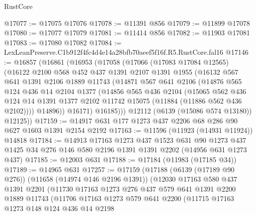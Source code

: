 \begin{lexlean}{RustCore}
\begin{coremodule}
@17077 := @17075 @17076
@17078 := @11391 @856
@17079 := @11899 @17078
@17080 := @17077 @17079
@17081 := @11414 @856
@17082 := @11903 @17081
@17083 := @17080 @17082
@17084 := LexLeanPreserve.C1b912f4fc4d4e14a28bfb70aeef5f16f.R5.RustCore.fal16
@17146 := @16857
    (@16861
      (@16953
        (@17058
          (@17066
            (@17083 @17084 @12565)
            (@16122
              @2100
              @568
              @452
              @437
              @1391
              @2107
              @1391
              @1955
              (@16132
                @567
                @641
                @1391
                @2106
                @1889
                @11743
                (@14871
                  @567
                  @641
                  @2106
                  (@14876
                    @565
                    @124
                    @436
                    @14
                    @2104
                    @1377
                    (@14856
                      @565
                      @436
                      @2104
                      (@15065
                        @562
                        @436
                        @124
                        @14
                        @1391
                        @1377
                        @2102
                        @11742
                        @15075
                        (@11884 (@11886 @562 @436 @2102))))
                    @14896))
                @16171)
              @16185)))
        @12112
        (@6139 (@15086 @574 @13180))
        @12125))
@17159 := @14917 @631 @177 @1273 @437 @2206 @68 @286 @90 @627 @1603 @1391 @2154 @2192
@17163 := @11596 (@11923 (@14931 @11924)) @14818
@17184 := @14913
    @17163
    @1273
    @437
    @1523
    @631
    @90
    @1273
    @437
    @1425
    @34
    @276
    @146
    @580
    @2196
    @1391
    @1391
    @2202
    (@14956 @631 @1273 @437)
@17185 := @12003 @631
@17188 := @17184 (@11983 (@17185 @34))
@17189 := @14965 @631
@17257 := @17159
    (@17188
      (@6139 (@17189 @90 @276))
      (@11658 (@14974 @146 @2196 @1391))
      (@12030
        @17163
        @580
        @437
        @1391
        @2201
        (@11730
          @17163
          @1273
          @276
          @437
          @579
          @641
          @1391
          @2200
          @1889
          @11743
          (@11706
            @17163
            @1273
            @579
            @641
            @2200
            (@11715
              @17163
              @1273
              @148
              @124
              @436
              @14
              @2198

\end{coremodule}
\end{lexlean}
